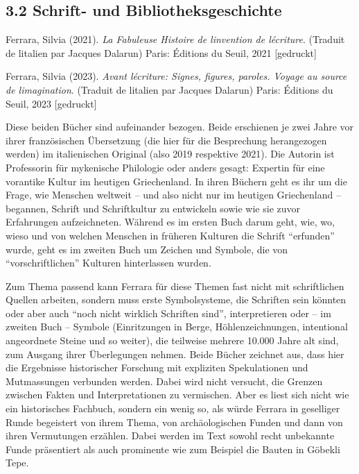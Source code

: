 \documentclass[a4paper,
fontsize=11pt,
oneside,
numbers=noperiodatend,
parskip=half-,
bibliography=totoc,
final
]{scrartcl}
\begin{document}
\subsection{3.2 Schrift- und
Bibliotheksgeschichte}\label{schrift--und-bibliotheksgeschichte}

Ferrara, Silvia (2021). \emph{La Fabuleuse Histoire de
l\textquotesingle invention de l\textquotesingle écriture}. (Traduit de
l\textquotesingle italien par Jacques Dalarun) Paris: Éditions du Seuil,
2021 {[}gedruckt{]}

Ferrara, Silvia (2023). \emph{Avant l\textquotesingle écriture: Signes,
figures, paroles. Voyage au source de l\textquotesingle imagination}.
(Traduit de l\textquotesingle italien par Jacques Dalarun) Paris:
Éditions du Seuil, 2023 {[}gedruckt{]}

Diese beiden Bücher sind aufeinander bezogen. Beide erschienen je zwei
Jahre vor ihrer französischen Übersetzung (die hier für die Besprechung
herangezogen werden) im italienischen Original (also 2019 respektive
2021). Die Autorin ist Professorin für mykenische Philologie oder anders
gesagt: Expertin für eine vorantike Kultur im heutigen Griechenland. In
ihren Büchern geht es ihr um die Frage, wie Menschen weltweit -- und
also nicht nur im heutigen Griechenland -- begannen, Schrift und
Schriftkultur zu entwickeln sowie wie sie zuvor Erfahrungen
aufzeichneten. Während es im ersten Buch darum geht, wie, wo, wieso und
von welchen Menschen in früheren Kulturen die Schrift \enquote{erfunden} wurde,
geht es im zweiten Buch um Zeichen und Symbole, die von
\enquote{vorschriftlichen} Kulturen hinterlassen wurden.

Zum Thema passend kann Ferrara für diese Themen fast nicht mit
schriftlichen Quellen arbeiten, sondern muss erste Symbolsysteme, die
Schriften sein könnten oder aber auch \enquote{noch nicht wirklich Schriften
sind}, interpretieren oder -- im zweiten Buch -- Symbole (Einritzungen
in Berge, Höhlenzeichnungen, intentional angeordnete Steine und so
weiter), die teilweise mehrere 10.000 Jahre alt sind, zum Ausgang ihrer
Überlegungen nehmen. Beide Bücher zeichnet aus, dass hier die Ergebnisse
historischer Forschung mit expliziten Spekulationen und Mutmassungen
verbunden werden. Dabei wird nicht versucht, die Grenzen zwischen Fakten
und Interpretationen zu vermischen. Aber es liest sich nicht wie ein
historisches Fachbuch, sondern ein wenig so, als würde Ferrara in
geselliger Runde begeistert von ihrem Thema, von archäologischen Funden
und dann von ihren Vermutungen erzählen. Dabei werden im Text sowohl
recht unbekannte Funde präsentiert als auch prominente wie zum Beispiel
die Bauten in Göbekli Tepe.
\end{document}
